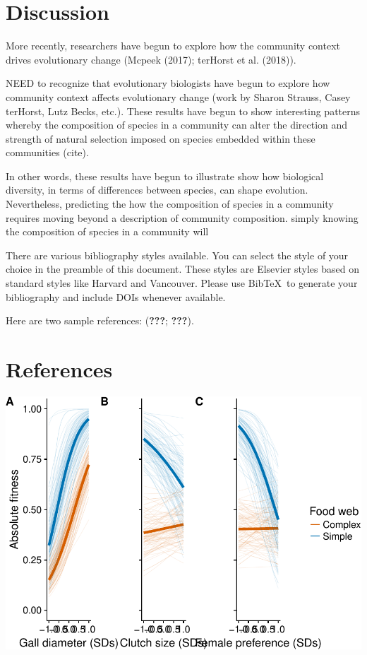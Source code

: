 \documentclass[]{elsarticle} %
\makeatletter
\def\maxwidth{\ifdim\Gin@nat@width>\linewidth\linewidth
\else\Gin@nat@width\fi}
\let\Oldincludegraphics\includegraphics
\renewcommand{\includegraphics}[1]{\Oldincludegraphics[width=\maxwidth]{#1}}
\makeatother
\begin{document}
\section{Discussion}\label{discussion}

More recently, researchers have begun to explore how the community
context drives evolutionary change (Mcpeek (2017); terHorst et al.
(2018)).

NEED to recognize that evolutionary biologists have begun to explore how
community context affects evolutionary change (work by Sharon Strauss,
Casey terHorst, Lutz Becks, etc.). These results have begun to show
interesting patterns whereby the composition of species in a community
can alter the direction and strength of natural selection imposed on
species embedded within these communities (cite).

In other words, these results have begun to illustrate show how
biological diversity, in terms of differences between species, can shape
evolution. Nevertheless, predicting the how the composition of species
in a community requires moving beyond a description of community
composition. simply knowing the composition of species in a community
will

There are various bibliography styles available. You can select the
style of your choice in the preamble of this document. These styles are
Elsevier styles based on standard styles like Harvard and Vancouver.
Please use BibTeX~to generate your bibliography and include DOIs
whenever available.

Here are two sample references: ({\textbf{???}}; {\textbf{???}}).

\section*{References}\label{references}

\includegraphics{elsevier_test_files/figure-latex/Univariate Absolute Fitness Landscapes-1.pdf}
\end{document}
